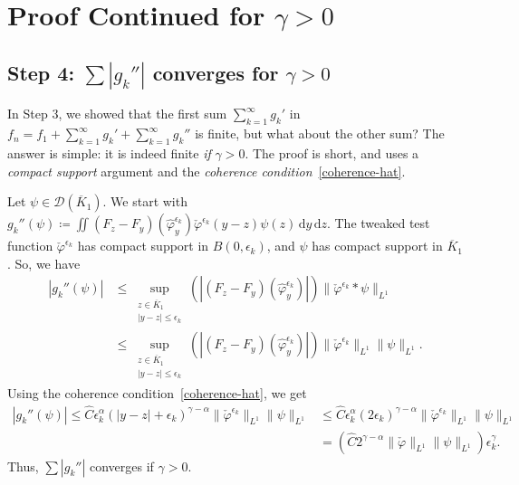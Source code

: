 
\chapter{Proof Continued for \texorpdfstring{\(\gamma > 0\)}{gamma > 0}}\label{chapter:proof-gamma-positive}

\section{Step 4: \texorpdfstring{\(\sum |g_k''|\) converges for \(\gamma > 0\)}{sum g''k converges for gamma > 0}}\label{step4}

In Step 3, we showed that the first sum \(\sum_{k=1}^\infty g_k'\) in \(f_n = f_1 + \sum_{k=1}^\infty g_k' + \sum_{k=1}^\infty g_k''\) is finite, but what about the other sum? The answer is simple: it is indeed finite \emph{if} \(\gamma > 0\). The proof is short, and uses a \emph{compact support} argument and the \emph{coherence condition}~\eqref{coherence-hat}.

Let \(\psi \in \mathcal{D}(\overline K_1)\). We start with \(g_k''(\psi) \coloneqq \iint (F_z - F_y)(\hat{\varphi}^{\epsilon_k}_{y}) \check \varphi^{\epsilon_k}(y-z) \psi(z) \, \mathrm{d}y \, \mathrm{d}z\). The tweaked test function \(\check \varphi^{\epsilon_k}\) has compact support in \(B(0,\epsilon_k)\), and \(\psi\) has compact support in \(\overline K_1\). So, we have 
\begin{align*}
    |g_k''(\psi)| 
    &\leq \sup_{\substack{z \in \overline{K}_1 \\ |y-z|\leq \epsilon_k}}
    \left( |(F_z -F_y)(\hat \varphi^{\epsilon_k}_y)| \right) \lVert \check \varphi^{\epsilon_k} * \psi \rVert_{L^1}\\
    &\leq \sup_{\substack{z \in \overline{K}_1 \\ |y-z|\leq \epsilon_k}}
    \left( |(F_z -F_y)(\hat \varphi^{\epsilon_k}_y)| \right) \lVert \check \varphi^{\epsilon_k} \rVert_{L^1} \lVert \psi \rVert_{L^1}.
\end{align*}
Using the coherence condition~\eqref{coherence-hat}, we get
\begin{align}
    |g_k''(\psi)| 
    \leq \hat C \epsilon_k^\alpha (|y-z| + \epsilon_k)^{\gamma - \alpha} \lVert \check \varphi^{\epsilon_k} \rVert_{L^1} \lVert \psi \rVert_{L^1}
    &\leq \hat C \epsilon_k^\alpha (2\epsilon_k)^{\gamma - \alpha} \lVert \check \varphi^{\epsilon_k} \rVert_{L^1} \lVert \psi \rVert_{L^1}\nonumber\\
    &= \left(\hat C  2^{\gamma - \alpha} \lVert \check \varphi \rVert_{L^1} \lVert \psi \rVert_{L^1}\right) \epsilon_k^\gamma. \label{Mustermaus}
\end{align}
Thus, \(\sum |g_k''|\) converges if \(\gamma > 0\).

